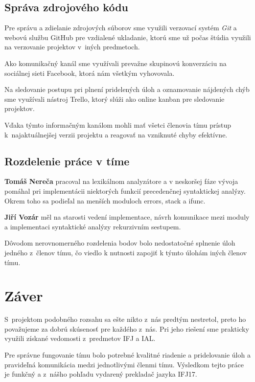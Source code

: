\documentclass{article}
\begin{document}
        \subsection{Správa zdrojového kódu}
        Pre správu a zdielanie zdrojových súborov sme využili verzovací systém \emph{Git} a webovú službu GitHub pre vzdialené ukladanie, ktorú sme už počas štúdia využili na verzovanie projektov v~iných predmetoch.
        
        Ako komunikačný kanál sme využívali prevažne skupinovú konverzáciu na sociálnej sieti Facebook, ktorá nám všetkým 
        vyhovovala.
        
        Na sledovanie postupu pri plnení pridelených úloh a oznamovanie nájdených chýb 
        sme využívali nástroj Trello, ktorý slúži ako online kanban pre sledovanie projektov. 
        
        Vďaka týmto informačným kanálom mohli mať všetci členovia tímu prístup k~najaktuálnejšej
        verzii projektu a reagovať na vzniknuté chyby efektívne.

        \subsection{Rozdelenie práce v tíme}

        \textbf{Tomáš Nereča} pracoval na lexikálnom analyzátore a v neskoršej fáze vývoja pomáhal pri implementácii niektorých
        funkcií precedenčnej syntaktickej analýzy. Okrem toho sa podieľal na menších moduloch errors, stack a ifunc. 

        \textbf{Jiří Vozár} měl na starosti vedení implementace, návrh komunikace mezi moduly a implementaci syntaktické analýzy rekurzivním sestupem.

        Dôvodom nerovnomerného rozdelenia bodov bolo nedostatočné splnenie úloh jedného 
        z~členov tímu, čo viedlo k nutnosti zapojiť k týmto úlohám iných členov tímu.

    \section{Záver}
    S~projektom podobného rozsahu sa ešte nikto z~nás predtým nestretol, preto ho považujeme za dobrú
    skúsenosť pre každého z~nás. Pri jeho riešení sme prakticky využili získané vedomosti z~predmetov 
    IFJ a IAL.
    
    Pre správne fungovanie tímu bolo potrebné kvalitné riadenie a pridelovanie úloh a pravideľná
    komunikácia medzi jednotlivými členmi tímu. Výsledkom tejto práce je funkčný a z~nášho pohľadu vydarený 
    prekladač jazyka IFJ17.
    
\end{document}
